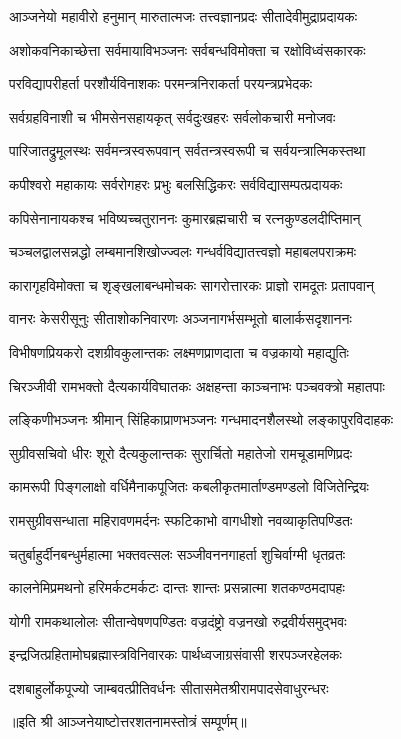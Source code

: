 

\twolineshloka
{आञ्जनेयो महावीरो हनुमान् मारुतात्मजः}
{तत्त्वज्ञानप्रदः सीतादेवीमुद्राप्रदायकः}

\twolineshloka
{अशोकवनिकाच्छेत्ता सर्वमायाविभञ्जनः}
{सर्वबन्धविमोक्ता च रक्षोविध्वंसकारकः}

\twolineshloka
{परविद्यापरीहर्ता परशौर्यविनाशकः}
{परमन्त्रनिराकर्ता परयन्त्रप्रभेदकः}

\twolineshloka
{सर्वग्रहविनाशी च भीमसेनसहायकृत्}
{सर्वदुःखहरः सर्वलोकचारी मनोजवः}

\twolineshloka
{पारिजातद्रुमूलस्थः सर्वमन्त्रस्वरूपवान्}
{सर्वतन्त्रस्वरूपी च सर्वयन्त्रात्मिकस्तथा}

\twolineshloka
{कपीश्वरो महाकायः सर्वरोगहरः प्रभुः}
{बलसिद्धिकरः सर्वविद्यासम्पत्प्रदायकः}

\twolineshloka
{कपिसेनानायकश्च भविष्यच्चतुराननः}
{कुमारब्रह्मचारी च रत्नकुण्डलदीप्तिमान्}

\twolineshloka
{चञ्चलद्वालसन्नद्धो लम्बमानशिखोज्ज्वलः}
{गन्धर्वविद्यातत्त्वज्ञो महाबलपराक्रमः}

\twolineshloka
{कारागृहविमोक्ता च शृङ्खलाबन्धमोचकः}
{सागरोत्तारकः प्राज्ञो रामदूतः प्रतापवान्}

\twolineshloka
{वानरः केसरीसूनुः सीताशोकनिवारणः}
{अञ्जनागर्भसम्भूतो बालार्कसदृशाननः}

\twolineshloka
{विभीषणप्रियकरो दशग्रीवकुलान्तकः}
{लक्ष्मणप्राणदाता च वज्रकायो महाद्युतिः}

\twolineshloka
{चिरञ्जीवी रामभक्तो दैत्यकार्यविघातकः}
{अक्षहन्ता काञ्चनाभः पञ्चवक्त्रो महातपाः}

\twolineshloka
{लङ्किणीभञ्जनः श्रीमान् सिंहिकाप्राणभञ्जनः}
{गन्धमादनशैलस्थो लङ्कापुरविदाहकः}

\twolineshloka
{सुग्रीवसचिवो धीरः शूरो दैत्यकुलान्तकः}
{सुरार्चितो महातेजो रामचूडामणिप्रदः}

\twolineshloka
{कामरूपी पिङ्गलाक्षो वर्धिमैनाकपूजितः}
{कबलीकृतमार्ताण्डमण्डलो विजितेन्द्रियः}

\twolineshloka
{रामसुग्रीवसन्धाता महिरावणमर्दनः}
{स्फटिकाभो वागधीशो नवव्याकृतिपण्डितः}

\twolineshloka
{चतुर्बाहुर्दीनबन्धुर्महात्मा भक्तवत्सलः}
{सञ्जीवननगाहर्ता शुचिर्वाग्मी धृतव्रतः}

\twolineshloka
{कालनेमिप्रमथनो हरिमर्कटमर्कटः}
{दान्तः शान्तः प्रसन्नात्मा शतकण्ठमदापहः}

\twolineshloka
{योगी रामकथालोलः सीतान्वेषणपण्डितः}
{वज्रदंष्ट्रो वज्रनखो रुद्रवीर्यसमुद्भवः}

\twolineshloka
{इन्द्रजित्प्रहितामोघब्रह्मास्त्रविनिवारकः}
{पार्थध्वजाग्रसंवासी शरपञ्जरहेलकः}

\twolineshloka
{दशबाहुर्लोकपूज्यो जाम्बवत्प्रीतिवर्धनः}
{सीतासमेतश्रीरामपादसेवाधुरन्धरः}

{॥इति श्री आञ्जनेयाष्टोत्तरशतनामस्तोत्रं सम्पूर्णम्॥}

